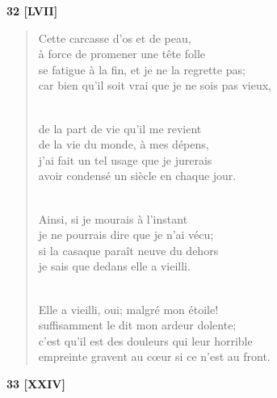 \documentclass[a4paper,12pt]{book}
\begin{document}
\bigskip

\begin{center} {\bf 32 [LVII]} \end{center}

\begin{verse}
Cette carcasse d'os et de peau, \\
à force de promener une tête folle \\
se fatigue à la fin, et je ne la regrette pas; \\
car bien qu'il soit vrai que je ne sois pas vieux, \\ \

de la part de vie qu'il me revient \\
de la vie du monde, à mes dépens, \\
j'ai fait un tel usage que je jurerais \\
avoir condensé un siècle en chaque jour. \\ \

Ainsi, si je mourais à l'instant \\
je ne pourrais dire que je n'ai vécu; \\
si la casaque paraît neuve du dehors \\
je sais que dedans elle a vieilli. \\ \

Elle a vieilli, oui; malgré mon étoile! \\
suffisamment le dit mon ardeur dolente; \\
c'est qu'il est des douleurs qui leur horrible \\
empreinte gravent au c{\oe}ur si ce n'est au front. \\
\end{verse}

\bigskip

\begin{center} {\bf 33 [XXIV]} \end{center}
\end{document}
